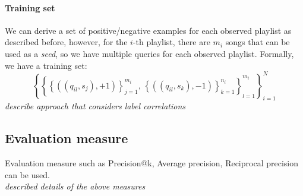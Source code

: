 \documentclass[9pt]{extarticle}
\newcommand{\1}{\mathbf{1}}
\begin{document}
\paragraph{Training set}
We can derive a set of positive/negative examples for each observed playlist as described before, however,
for the $i$-th playlist, there are $m_i$ songs that can be used as a \emph{seed}, so we have multiple queries for each observed playlist.
Formally, we have a training set:
\begin{equation*}
\left\{ \left\{ 
        \left\{\left((q_{il}, s_j), +1\right) \right\}_{j=1}^{m_i}, \,
        \left\{\left((q_{il}, s_k), -1\right) \right\}_{k=1}^{n_i}  \right\}_{l=1}^{m_i} \right\}_{i=1}^N
\end{equation*}
\emph{describe approach that considers label correlations}




\subsection{Evaluation measure}
Evaluation measure such as Precision@k, Average precision, Reciprocal precision can be used.
\\ \emph{described details of the above measures}

%
%


\end{document}
